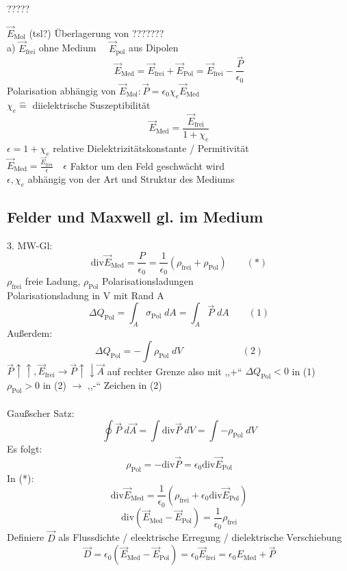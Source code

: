 \documentclass[titlepage,12pt,a4paper,ngerman]{report}
\newcommand{\tx}[1]{\textrm{#1}}
\begin{document}

?????


$\vec{E}_{\tx{Mol}}$ (tsl?) Überlagerung von ???????\\
a) $\vec{E}_{\tx{frei}}$ ohne Medium $\quad \vec{E}_{\tx{pol}}$ aus Dipolen
$$\vec{E}_{\tx{Med}} = \vec{E}_{\tx{frei}} + \vec{E}_{\tx{Pol}} = \vec{E}_{\tx{frei}} - \frac{\vec{P}}{\epsilon_0}$$
Polarisation abhängig von $ \vec{E}_{\tx{Mol}}: \vec{P} = \epsilon_0 \chi_e \vec{E}_{\tx{Med}}$\\
$\chi_e \widehat{=}$ diielektrische Suszeptibilität
$$\vec{E}_{\tx{Med}} = \frac{\vec{E}_{\tx{frei}}}{1+\chi_e}$$
$\epsilon = 1+ \chi_e$  relative Dielektrizitätskonstante / Permitivität\\
$\vec{E}_{\tx{Med}} = \frac{\vec{E}_{\tx{frei}}}{\epsilon} \quad \epsilon$ Faktor um den Feld geschwächt wird\\
$\epsilon,\chi_e$ abhängig von der Art und Struktur des Mediums

\subsection{Felder und Maxwell gl. im Medium}
3. MW-Gl: $$\tx{div} \vec{E}_{\tx{Med}} = \frac{P}{\epsilon_0} = \frac{1}{\epsilon_0}(\rho_{\tx{frei}} + \rho_{\tx{Pol}}) \qquad (*)$$
$\rho_{\tx{frei}}$ freie Ladung, $\rho_{\tx{Pol}}$ Polarisationsladungen\\
Polarisationsladung in V mit Rand A
$$\Delta Q_{\tx{Pol}} = \int_A \sigma_{\tx{Pol}} \;dA = \int_A \vec{P} \; dA \qquad (1)$$
Außerdem:
$$\Delta Q_{\tx{Pol}} = -\int \rho_{\tx{Pol}} \; dV \qquad \qquad \qquad \: (2)$$
$\vec{P}\uparrow\uparrow,\vec{E}_{\tx{frei}} \rightarrow \vec{P} \uparrow\downarrow \vec{A}$ auf rechter Grenze also mit ,,+`` $\Delta Q_{\tx{Pol}} < 0$ in (1)\\
$\rho_{\tx{Pol}} > 0$ in (2) $\rightarrow$ ,,-`` Zeichen in (2)\\\\
Gaußscher Satz:
$$\oint \vec{P}\; d\vec{A} = \int \tx{div} \vec{P} \; dV = \int - \rho_{\tx{Pol}} \; dV$$
Es folgt: $$\rho_{\tx{Pol}} = - \tx{div} \vec{P} = \epsilon_0 \tx{div} \vec{E}_{\tx{Pol}}$$
In (*): $$\tx{div}\vec{E}_{\tx{Med}} = \frac{1}{\epsilon_0} (\rho_{\tx{frei}} + \epsilon_0 \tx{div}\vec{E}_{\tx{Pol}})$$
$$\tx{div}(\vec{E}_{\tx{Med}} - \vec{E}_{\tx{Pol}}) = \frac{1}{\epsilon_0} \rho_{\tx{frei}}$$
Definiere  $\vec{D}$ als Flussdichte / eleektrische Erregung / dielektrische Verschiebung
$$ \vec{D} = \epsilon_0(\vec{E}_{\tx{Med}} - \vec{E}_{\tx{Pol}}) = \epsilon_0 \vec{E}_{\tx{frei}} = \epsilon_0 E_{\tx{Med}} + \vec{P}$$
\end{document}
